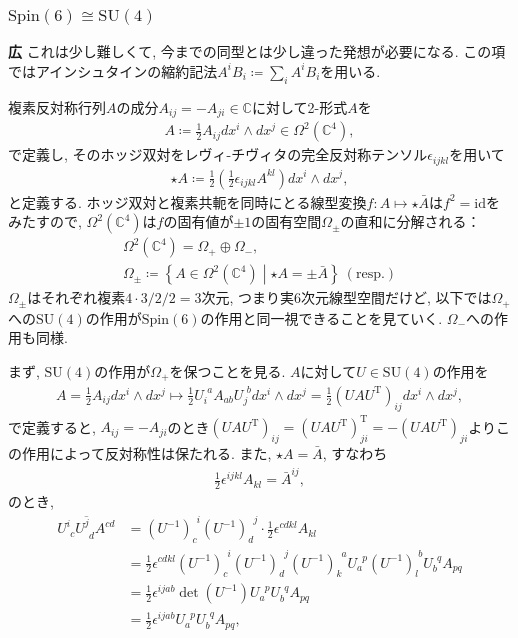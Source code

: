 \documentclass{ltjsarticle}
\theoremstyle{definition}
\begin{document}
\subsubsection{$\mathrm{Spin}(6)\cong\mathrm{SU}(4)$\label{subsubsection:exceptional_isomorphism_su4}}
\noindent
\textbf{広} これは少し難しくて, 今までの同型とは少し違った発想が必要になる.
この項ではアインシュタインの縮約記法$A^i B_i\coloneqq\sum_i A^i B_i$を用いる.\par
複素反対称行列$A$の成分$A_{ij}=-A_{ji}\in \mathbb C$に対して2-形式$A$を
\begin{align}
A\coloneqq\frac12A_{ij}dx^i\wedge dx^j\in\Omega^2(\mathbb C^4),
\end{align}
で定義し, そのホッジ双対をレヴィ-チヴィタの完全反対称テンソル$\epsilon_{ijkl}$を用いて
\begin{align}
\star A\coloneqq\frac12\left(\frac12\epsilon_{ijkl}A^{kl}\right)dx^i\wedge dx^j,
\end{align}
と定義する. ホッジ双対と複素共軛を同時にとる線型変換$f:A\mapsto\star\bar A$は$f^2=\mathrm{id}$をみたすので, $\Omega^2(\mathbb C^4)$は$f$の固有値が$\pm1$の固有空間$\Omega_{\pm}$の直和に分解される：
\begin{gather}
\Omega^2(\mathbb C^4)=\Omega_+\oplus\Omega_-,\\
\Omega_{\pm}\coloneqq\left\{A\in\Omega^2(\mathbb C^4)\middle|\star A=\pm\bar A\right\}\ \mathrm{(resp.)}
\end{gather}
$\Omega_{\pm}$はそれぞれ複素$4\cdot3/2/2=3$次元, つまり実6次元線型空間だけど, 以下では$\Omega_+$への$\mathrm{SU}(4)$の作用が$\mathrm{Spin}(6)$の作用と同一視できることを見ていく. $\Omega_-$への作用も同様.\par
まず, $\mathrm{SU}(4)$の作用が$\Omega_+$を保つことを見る. $A$に対して$U\in\mathrm{SU}(4)$の作用を
\begin{align}
A=\frac12A_{ij}dx^i\wedge dx^j\mapsto\frac12U_i^{\phantom{i}a}A_{ab}U_j^{\phantom{i}b}dx^i\wedge dx^j=\frac12\left(UAU^{\mathrm T}\right)_{ij}dx^i\wedge dx^j,
\end{align}
で定義すると, $A_{ij}=-A_{ji}$のとき$\left(UAU^{\mathrm T}\right)_{ij}=\left(UAU^{\mathrm T}\right)^{\mathrm T}_{ji}=-\left(UAU^{\mathrm T}\right)_{ji}$よりこの作用によって反対称性は保たれる. また, $\star A=\bar A$, すなわち
\begin{align}
\frac12\epsilon^{ijkl}A_{kl}=\bar A^{ij},
\end{align}
のとき, 
\begin{align}
\overline{U^i_{\phantom{i}c}U^j_{\phantom{j}d}A^{cd}}&=\left(U^{-1}\right)_c^{\phantom{c}i}\left(U^{-1}\right)_d^{\phantom{d}j}\cdot\frac12\epsilon^{cdkl}A_{kl}\\
&=\frac12\epsilon^{cdkl}\left(U^{-1}\right)_c^{\phantom{c}i}\left(U^{-1}\right)_d^{\phantom{d}j}\left(U^{-1}\right)_k^{\phantom{k}a}U_a^{\phantom{a}p}\left(U^{-1}\right)_l^{\phantom{l}b}U_b^{\phantom{b}q}A_{pq}\\
&=\frac12\epsilon^{ijab}\det\left(U^{-1}\right)U_a^{\phantom{a}p}U_b^{\phantom{b}q}A_{pq}\\
&=\frac12\epsilon^{ijab}U_a^{\phantom{a}p}U_b^{\phantom{b}q}A_{pq},
\end{align}
\end{document}
